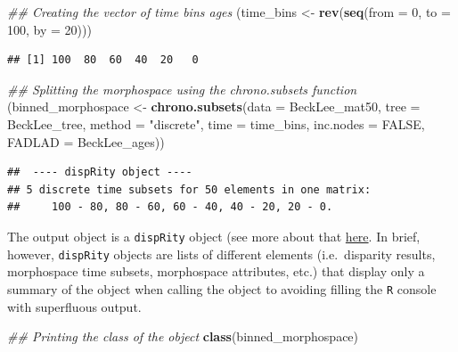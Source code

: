 \documentclass[]{book}
\newenvironment{Shaded}{\begin{snugshade}}{\end{snugshade}}
\newcommand{\CommentTok}[1]{\textcolor[rgb]{0.56,0.35,0.01}{\textit{#1}}}
\newcommand{\DataTypeTok}[1]{\textcolor[rgb]{0.13,0.29,0.53}{#1}}
\newcommand{\DecValTok}[1]{\textcolor[rgb]{0.00,0.00,0.81}{#1}}
\newcommand{\KeywordTok}[1]{\textcolor[rgb]{0.13,0.29,0.53}{\textbf{#1}}}
\newcommand{\NormalTok}[1]{#1}
\newcommand{\OtherTok}[1]{\textcolor[rgb]{0.56,0.35,0.01}{#1}}
\newcommand{\StringTok}[1]{\textcolor[rgb]{0.31,0.60,0.02}{#1}}
\begin{document}
\begin{Shaded}
\begin{Highlighting}[]
\CommentTok{## Creating the vector of time bins ages}
\NormalTok{(time_bins <-}\StringTok{ }\KeywordTok{rev}\NormalTok{(}\KeywordTok{seq}\NormalTok{(}\DataTypeTok{from =} \DecValTok{0}\NormalTok{, }\DataTypeTok{to =} \DecValTok{100}\NormalTok{, }\DataTypeTok{by =} \DecValTok{20}\NormalTok{)))}
\end{Highlighting}
\end{Shaded}

\begin{verbatim}
## [1] 100  80  60  40  20   0
\end{verbatim}

\begin{Shaded}
\begin{Highlighting}[]
\CommentTok{## Splitting the morphospace using the chrono.subsets function}
\NormalTok{(binned_morphospace <-}\StringTok{ }\KeywordTok{chrono.subsets}\NormalTok{(}\DataTypeTok{data =}\NormalTok{ BeckLee_mat50, }\DataTypeTok{tree =}\NormalTok{ BeckLee_tree,}
    \DataTypeTok{method =} \StringTok{"discrete"}\NormalTok{, }\DataTypeTok{time =}\NormalTok{ time_bins, }\DataTypeTok{inc.nodes =} \OtherTok{FALSE}\NormalTok{,}
    \DataTypeTok{FADLAD =}\NormalTok{ BeckLee_ages))}
\end{Highlighting}
\end{Shaded}

\begin{verbatim}
##  ---- dispRity object ---- 
## 5 discrete time subsets for 50 elements in one matrix:
##     100 - 80, 80 - 60, 60 - 40, 40 - 20, 20 - 0.
\end{verbatim}

The output object is a \texttt{dispRity} object (see more about that \protect\hyperlink{The-guts-of-the-dispRity-package}{here}.
In brief, however, \texttt{dispRity} objects are lists of different elements (i.e.~disparity results, morphospace time subsets, morphospace attributes, etc.) that display only a summary of the object when calling the object to avoiding filling the \texttt{R} console with superfluous output.

\begin{Shaded}
\begin{Highlighting}[]
\CommentTok{## Printing the class of the object}
\KeywordTok{class}\NormalTok{(binned_morphospace)}
\end{Highlighting}
\end{Shaded}
\end{document}

